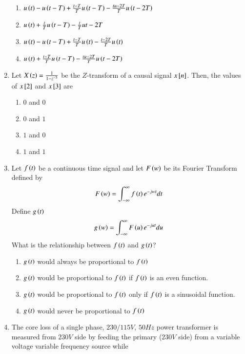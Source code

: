 \documentclass[journal]{IEEEtran}
\begin{document}
\begin{enumerate}
		\begin{enumerate}
			\item $u\left(t\right)-u\left(t-T\right)+\frac{t-T}{T}u\left(t-T\right)-\frac{tu-2T}{T}u\left(t-2T\right)$
			\item $u\left(t\right)+ \frac{t}{T}u\left(t-T\right)-\frac{t}{T}u{t-2T}$
			\item $u\left(t\right)-u\left(t-T\right)+\frac{t-T}{T}u\left(t\right)-\frac{t-2T}{T}u\left(t\right)$
	        \item $u\left(t\right)+\frac{t-T}{T}u\left(t-T\right)-\frac{tu-2T}{T}u\left(t-2T\right)$
        	\end{enumerate}
	\item Let $X\left(z\right)=\frac{1}{1-z^{-3}}$ be the $Z$-transform of a causal signal $x{}\left[n\right]$. Then, the values of $x{}\left[2\right]$ and $x{}\left[3\right]$ are
		\begin{enumerate}
		       \item $0$ and $0$
		       \item $0$ and $1$
		       \item $1$ and $0$
		       \item $1$ and $1$
        	\end{enumerate}	
	\item Let $f\left(t\right)$ be a continuous time signal and let $F\left(w\right)$ be its Fourier Transform defined by
 \begin{align*}
     F\left(w\right)=\int_{-\infty}^{\infty}f\left(t\right)e^{-jwt}dt
 \end{align*}
 Define $g\left(t\right)$
 \begin{align*}
     g\left(w\right)=\int_{-\infty}^{\infty}F\left(u\right)e^{-jut}du
 \end{align*}
 What is the relationship between $f\left(t\right)$ and $g\left(t\right)$?
		\begin{enumerate}
			\item $g\left(t\right)$ would always be proportional to $f\left(t\right)$
			\item $g\left(t\right)$ would be proportional to $f\left(t\right)$ if $f\left(t\right)$ is an even function.
			\item $g\left(t\right)$ would be proportional to $f\left(t\right)$ only if $f\left(t\right)$ is a sinusoidal function.
			\item $g\left(t\right)$ would never be proportional to $f\left(t\right)$
        	\end{enumerate}
	\item The core loss of a single phase, $230/115 V$, $50 Hz$ power transformer is measured from $230 V$ side
by feeding the primary ($230 V$ side) from a variable voltage variable frequency source while

\end{enumerate}
\end{document}

